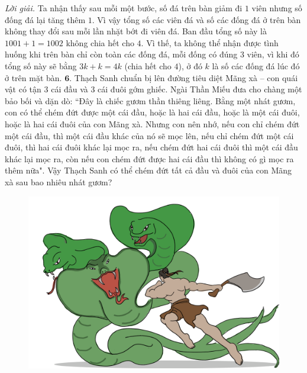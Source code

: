 \begin{multicols}{2}
\begin{figure}[H]
		\vspace*{-15pt}
	\end{figure}
	\textit{Lời giải.} 	Ta nhận thấy sau mỗi một bước, số đá trên bàn giảm đi $1$ viên nhưng số đống đá lại tăng thêm $1$. Vì vậy tổng số các viên đá và số các đống đá ở trên bàn không thay đổi sau mỗi lần nhặt bớt đi viên đá. Ban đầu tổng số này là $1001+1=1002$ không chia hết cho $4$. Vì thế, ta không thể nhận được tình huống khi trên bàn chỉ còn toàn các đống đá, mỗi đống có đúng $3$ viên, vì khi đó tổng số này sẽ bằng $3k+k=4k$ (chia hết cho $4$), ở đó $k$ là số các đống đá lúc đó ở trên mặt bàn. 
	\vskip 0.1cm
 	$\pmb{6.}$ Thạch Sanh chuẩn bị lên đường tiêu diệt Mãng xà -- con quái vật có tận $3$ cái đầu và $3$ cái đuôi gớm ghiếc. Ngài Thần Miếu đưa cho chàng một bảo bối và dặn dò: ``Đây là chiếc gươm thần thiêng liêng. Bằng một nhát gươm, con có thể chém đứt được một cái đầu, hoặc là hai cái đầu, hoặc là một cái đuôi, hoặc là hai cái đuôi của con Mãng xà. Nhưng con nên nhớ, nếu con chỉ chém đứt một cái đầu, thì một cái đầu khác của nó sẽ mọc lên, nếu chỉ chém đứt một cái đuôi, thì hai cái đuôi khác lại mọc ra, nếu chém đứt hai cái đuôi thì một cái đầu khác lại mọc ra, còn nếu con chém đứt được hai cái đầu thì không có gì mọc ra thêm nữa". Vậy Thạch Sanh có thể chém đứt tất cả đầu và đuôi của con Mãng xà sau bao nhiêu nhát gươm?
	\begin{figure}[H]
		\centering
		\vspace*{-5pt}
		\captionsetup{labelformat= empty, justification=centering}
		\includegraphics[width=1\linewidth]{bai6}
		\vspace*{-5pt}
	\end{figure}

\end{multicols}
